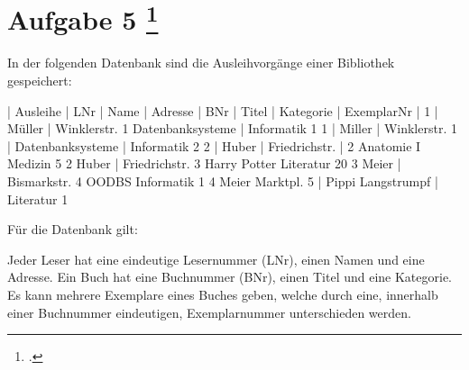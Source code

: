 \documentclass{lehramt-informatik-aufgabe}
\begin{document}
\let\ah=\liAttributHuelle
\let\FA=\liFunktionaleAbhaengigkeiten
\let\m=\liAttributMenge
\let\schrittE=\liSyntheseSchrittUeberschriftErklaerung

\section{Aufgabe 5
\footcite{66116:2017:03}}

In der folgenden Datenbank sind die Ausleihvorgänge einer Bibliothek gespeichert:

| Ausleihe | LNr | Name | Adresse | BNr | Titel | Kategorie | ExemplarNr |
1 | Müller | Winklerstr. 1 Datenbanksysteme | Informatik 1
1 | Miller | Winklerstr. 1 | Datenbanksysteme | Informatik 2
2 | Huber | Friedrichstr. | 2 Anatomie I Medizin 5
2 Huber | Friedrichstr. 3 Harry Potter Literatur 20
3 Meier | Bismarkstr. 4 OODBS Informatik 1
4 Meier Marktpl. 5 | Pippi Langstrumpf | Literatur 1

Für die Datenbank gilt:

Jeder Leser hat eine eindeutige Lesernummer (LNr), einen Namen und eine
Adresse. Ein Buch hat eine Buchnummer (BNr), einen Titel und eine
Kategorie. Es kann mehrere Exemplare eines Buches geben, welche durch
eine, innerhalb einer Buchnummer eindeutigen, Exemplarnummer
unterschieden werden.
\end{document}
